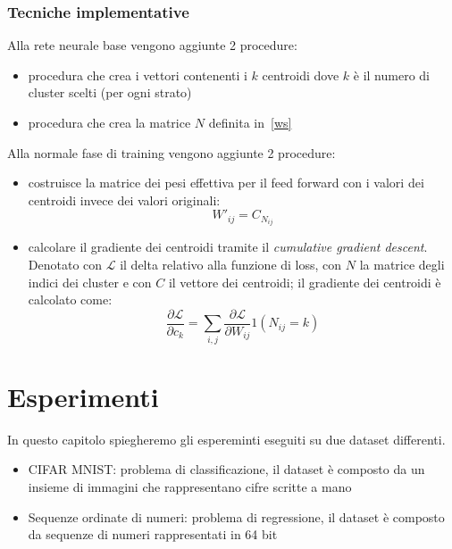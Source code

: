 \documentclass[11pt,a4paper,twoside,
openright]{book}
\begin{document}
\subsection{Tecniche implementative}
Alla rete neurale base vengono aggiunte 2 procedure:
\begin{itemize}
\item procedura che crea i vettori contenenti i $k$ centroidi dove $k$ è il numero di cluster scelti (per ogni strato)
\item procedura che crea la matrice $N$ definita in~\eqref{ws}
\end{itemize}
Alla normale fase di training vengono aggiunte 2 procedure:
\begin{itemize}
\item costruisce la matrice dei pesi effettiva per il feed forward con i valori dei centroidi invece dei valori originali:
\begin{equation}
W'_{ij} = C_{N_{ij}}
\label{wprimo}
\end{equation}
\item calcolare il gradiente dei centroidi tramite il \textit{cumulative gradient descent}. Denotato con $\mathcal{L}$ il delta relativo alla funzione di loss, con $N$ la matrice degli indici dei cluster e con $C$ il vettore dei centroidi; il gradiente dei centroidi è calcolato come:
\begin{equation}
\frac{\partial \mathcal{L}}{\partial c_{k}}=\sum\limits_{i,j}\frac{\partial \mathcal{L}}{\partial W_{ij}}1(N_{ij}=k)
\label{gradientews}
\end{equation}


\end{itemize}


\chapter{Esperimenti}
In questo capitolo spiegheremo gli espereminti eseguiti su due dataset differenti.
\begin{itemize}
\item CIFAR MNIST: problema di classificazione, il dataset è composto da un insieme di immagini che rappresentano cifre scritte a mano
\item Sequenze ordinate di numeri: problema di regressione, il dataset è composto da sequenze di numeri rappresentati in 64 bit
\end{itemize}
\end{document}
